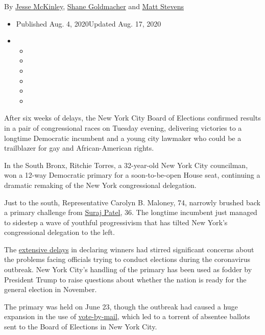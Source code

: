 By \href{https://www.nytimes3xbfgragh.onion/by/jesse-mckinley}{Jesse
McKinley},
\href{https://www.nytimes3xbfgragh.onion/by/shane-goldmacher}{Shane
Goldmacher} and
\href{https://www.nytimes3xbfgragh.onion/by/matt-stevens}{Matt Stevens}

\begin{itemize}
\item
  Published Aug. 4, 2020Updated Aug. 17, 2020
\item
  \begin{itemize}
  \item
  \item
  \item
  \item
  \item
  \item
  \end{itemize}
\end{itemize}

After six weeks of delays, the New York City Board of Elections
confirmed results in a pair of congressional races on Tuesday evening,
delivering victories to a longtime Democratic incumbent and a young city
lawmaker who could be a trailblazer for gay and African-American rights.

In the South Bronx, Ritchie Torres, a 32-year-old New York City
councilman, won a 12-way Democratic primary for a soon-to-be-open House
seat, continuing a dramatic remaking of the New York congressional
delegation.

Just to the south, Representative Carolyn B. Maloney, 74, narrowly
brushed back a primary challenge from
\href{https://www.nytimes3xbfgragh.onion/2018/06/21/nyregion/congress-primaries-democrats-midterm-ny.html}{Suraj
Patel}, 36. The longtime incumbent just managed to sidestep a wave of
youthful progressivism that has tilted New York's congressional
delegation to the left.

The
\href{https://www.nytimes3xbfgragh.onion/2020/08/03/nyregion/nyc-mail-ballots-voting.html}{extensive
delays} in declaring winners had stirred significant concerns about the
problems facing officials trying to conduct elections during the
coronavirus outbreak. New York City's handling of the primary has been
used as fodder by President Trump to raise questions about whether the
nation is ready for the general election in November.

The primary was held on June 23, though the outbreak had caused a huge
expansion in the use of
\href{https://www.nytimes3xbfgragh.onion/interactive/2020/08/11/us/politics/vote-by-mail-us-states.html}{vote-by-mail},
which led to a torrent of absentee ballots sent to the Board of
Elections in New York City.

